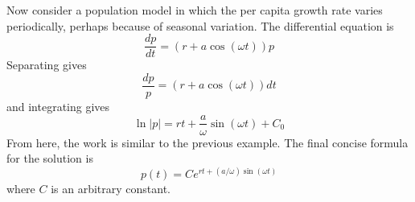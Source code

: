\begin{xexample}
Now consider a population model in which the per capita growth
rate varies periodically, perhaps because of seasonal variation.
The differential equation is
\begin{equation}
   \frac{dp}{dt} = (r + a\cos(\omega t))p
\end{equation}
Separating gives
\begin{equation}
  \frac{dp}{p} = \left( r+a\cos(\omega t) \right) dt
\end{equation}
and integrating gives
\begin{equation}
  \ln | p | = rt + \frac{a}{\omega} \sin(\omega t) + C_0
\end{equation}
From here, the work is similar to the previous example.
The final concise formula for the solution is
\begin{equation}
   p(t) = Ce^{rt + (a/\omega)\sin(\omega t)}
\end{equation}
where $C$ is an arbitrary constant.
\end{xexample}
%
